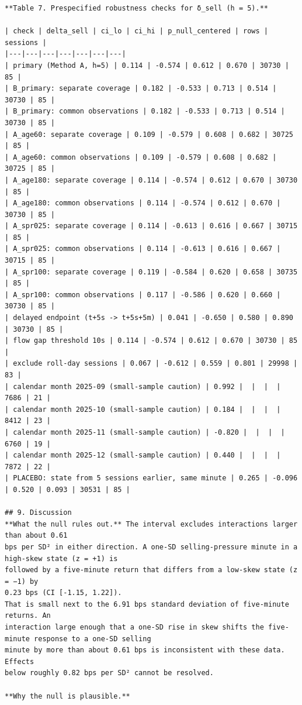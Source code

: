 \documentclass[11pt]{article}
\begin{document}
\begin{verbatim}
**Table 7. Prespecified robustness checks for δ_sell (h = 5).**

| check | delta_sell | ci_lo | ci_hi | p_null_centered | rows | sessions |
|---|---|---|---|---|---|---|
| primary (Method A, h=5) | 0.114 | -0.574 | 0.612 | 0.670 | 30730 | 85 |
| B_primary: separate coverage | 0.182 | -0.533 | 0.713 | 0.514 | 30730 | 85 |
| B_primary: common observations | 0.182 | -0.533 | 0.713 | 0.514 | 30730 | 85 |
| A_age60: separate coverage | 0.109 | -0.579 | 0.608 | 0.682 | 30725 | 85 |
| A_age60: common observations | 0.109 | -0.579 | 0.608 | 0.682 | 30725 | 85 |
| A_age180: separate coverage | 0.114 | -0.574 | 0.612 | 0.670 | 30730 | 85 |
| A_age180: common observations | 0.114 | -0.574 | 0.612 | 0.670 | 30730 | 85 |
| A_spr025: separate coverage | 0.114 | -0.613 | 0.616 | 0.667 | 30715 | 85 |
| A_spr025: common observations | 0.114 | -0.613 | 0.616 | 0.667 | 30715 | 85 |
| A_spr100: separate coverage | 0.119 | -0.584 | 0.620 | 0.658 | 30735 | 85 |
| A_spr100: common observations | 0.117 | -0.586 | 0.620 | 0.660 | 30730 | 85 |
| delayed endpoint (t+5s -> t+5s+5m) | 0.041 | -0.650 | 0.580 | 0.890 | 30730 | 85 |
| flow gap threshold 10s | 0.114 | -0.574 | 0.612 | 0.670 | 30730 | 85 |
| exclude roll-day sessions | 0.067 | -0.612 | 0.559 | 0.801 | 29998 | 83 |
| calendar month 2025-09 (small-sample caution) | 0.992 |  |  |  | 7686 | 21 |
| calendar month 2025-10 (small-sample caution) | 0.184 |  |  |  | 8412 | 23 |
| calendar month 2025-11 (small-sample caution) | -0.820 |  |  |  | 6760 | 19 |
| calendar month 2025-12 (small-sample caution) | 0.440 |  |  |  | 7872 | 22 |
| PLACEBO: state from 5 sessions earlier, same minute | 0.265 | -0.096 | 0.520 | 0.093 | 30531 | 85 |

## 9. Discussion
**What the null rules out.** The interval excludes interactions larger than about 0.61
bps per SD² in either direction. A one-SD selling-pressure minute in a high-skew state (z = +1) is
followed by a five-minute return that differs from a low-skew state (z = −1) by
0.23 bps (CI [-1.15, 1.22]).
That is small next to the 6.91 bps standard deviation of five-minute returns. An
interaction large enough that a one-SD rise in skew shifts the five-minute response to a one-SD selling
minute by more than about 0.61 bps is inconsistent with these data. Effects
below roughly 0.82 bps per SD² cannot be resolved.

**Why the null is plausible.**


\end{verbatim}
\end{document}

